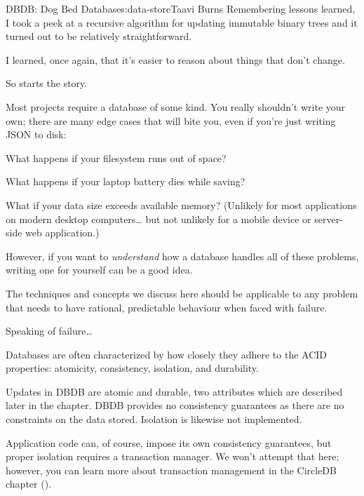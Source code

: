 \begin{aosachapter}{DBDB: Dog Bed Database}{s:data-store}{Taavi Burns}
Remembering lessons learned, I took a peek at a recursive algorithm for
updating immutable binary trees and it turned out to be relatively
straightforward.

I learned, once again, that it's easier to reason about things that
don't change.

So starts the story.

\label{why-is-it-interesting}

Most projects require a database of some kind. You really shouldn't
write your own; there are many edge cases that will bite you, even if
you're just writing JSON to disk:

\begin{aosaitemize}

\item
  What happens if your filesystem runs out of space?
\item
  What happens if your laptop battery dies while saving?
\item
  What if your data size exceeds available memory? (Unlikely for most
  applications on modern desktop computers\ldots{} but not unlikely for
  a mobile device or server-side web application.)
\end{aosaitemize}

However, if you want to \emph{understand} how a database handles all of
these problems, writing one for yourself can be a good idea.

The techniques and concepts we discuss here should be applicable to any
problem that needs to have rational, predictable behaviour when faced
with failure.

Speaking of failure\ldots{}

\label{characterizing-failure}

Databases are often characterized by how closely they adhere to the ACID
properties: atomicity, consistency, isolation, and durability.

Updates in DBDB are atomic and durable, two attributes which are
described later in the chapter. DBDB provides no consistency guarantees
as there are no constraints on the data stored. Isolation is likewise
not implemented.

Application code can, of course, impose its own consistency guarantees,
but proper isolation requires a transaction manager. We won't attempt
that here; however, you can learn more about transaction management in
the CircleDB chapter ().


\end{aosachapter}
